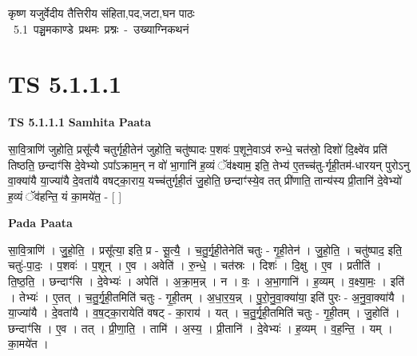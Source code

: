 \documentclass[17pt]{extarticle}
\begin{document}
\begin{titlepage}
    \begin{center}
 
\begin{sanskrit}
    { \Large
    कृष्ण यजुर्वेदीय तैत्तिरीय संहिता,पद,जटा,घन पाठः 
    }
    \\
    \vspace{2.5cm}
    \mbox{ \Large
    5.1      पञ्चमकाण्डे प्रथमः प्रश्नः - उख्याग्निकथनं   }
\end{sanskrit}
\end{center}

\end{titlepage}
\tableofcontents
{}
\pagebreak


\section{ TS 5.1.1.1 }

\textbf{TS 5.1.1.1 } \newline
\textbf{Samhita Paata} \newline

सा॒वि॒त्राणि॑ जुहोति॒ प्रसू᳚त्यै चतुर्गृही॒तेन॑ जुहोति॒ चतु॑ष्पादः प॒शवः॑ प॒शूने॒वाऽव॑ रुन्धे॒ चत॑स्रो॒ दिशो॑ दि॒क्ष्वे॑व प्रति॑ तिष्ठति॒ छन्दाꣳ॑सि दे॒वेभ्यो ऽपा᳚ऽक्राम॒न् न वो॑ भा॒गानि॑ ह॒व्यं ॅव॑क्ष्याम॒ इति॒ तेभ्य॑ ए॒तच्च॑तु-र्गृही॒तम॑-धारयन् पुरोऽनु वा॒क्या॑यै या॒ज्या॑यै दे॒वता॑यै वषट्का॒राय॒ यच्च॑तुर्गृही॒तं जु॒होति॒ छन्दाꣳ॑स्ये॒व तत् प्री॑णाति॒ तान्य॑स्य प्री॒तानि॑ दे॒वेभ्यो॑ ह॒व्यं ॅव॑हन्ति॒ यं का॒मये॑त॒ - [  ] \newline

\textbf{Pada Paata} \newline

सा॒वि॒त्राणि॑ । जु॒हो॒ति॒ । प्रसू᳚त्या॒ इति॒ प्र - सू॒त्यै॒ । च॒तु॒र्गृ॒ही॒तेनेति॑ चतुः - गृ॒ही॒तेन॑ । जु॒हो॒ति॒ । चतु॑ष्पाद॒ इति॒ चतुः॑-पा॒दः॒ । प॒शवः॑ । प॒शून् । ए॒व । अवेति॑ । रु॒न्धे॒ । चत॑स्रः । दिशः॑ । दि॒क्षु । ए॒व । प्रतीति॑ । ति॒ष्ठ॒ति॒ । छन्दाꣳ॑सि । दे॒वेभ्यः॑ । अपेति॑ । अ॒क्रा॒म॒न्न् । न । वः॒ । अ॒भा॒गानि॑ । ह॒व्यम् । व॒क्ष्या॒मः॒ । इति॑ । तेभ्यः॑ । ए॒तत् । च॒तु॒र्गृ॒ही॒तमिति॑ चतुः - गृ॒ही॒तम् । अ॒धा॒र॒य॒न्न् । पु॒रो॒नु॒वा॒क्या॑या॒ इति॑ पुरः - अ॒नु॒वा॒क्या॑यै । या॒ज्या॑यै । दे॒वता॑यै । व॒ष॒ट्का॒रायेति॑ वषट् - का॒राय॑ । यत् । च॒तु॒र्गृ॒ही॒तमिति॑ चतुः - गृ॒ही॒तम् । जु॒होति॑ । छन्दाꣳ॑सि । ए॒व । तत् । प्री॒णा॒ति॒ । तामि॑ । अ॒स्य॒ । प्री॒तानि॑ । दे॒वेभ्यः॑ । ह॒व्यम् । व॒ह॒न्ति॒ । यम् । का॒मये॑त ।  \newline
\end{document}
